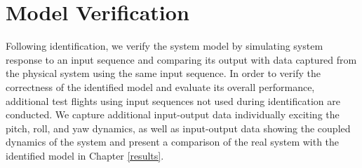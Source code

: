 \section{Model Verification}
Following identification, we verify the system model by simulating system response to an input sequence and comparing its output with data captured from the physical system using the same input sequence. In order to verify the correctness of the identified model and evaluate its overall performance, additional test flights using input sequences not used during identification are conducted. We capture additional input-output data individually exciting the pitch, roll, and yaw dynamics, as well as input-output data showing the coupled dynamics of the system and present a comparison of the real system with the identified model in Chapter \ref{results}.





